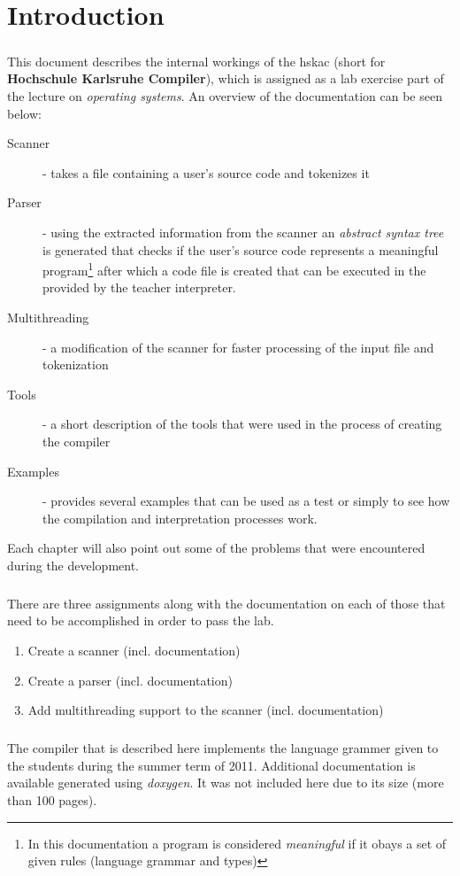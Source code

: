 \chapter{Introduction} 
\paragraph{}
	This document describes the internal workings of the hskac (short for \textbf{Hochschule Karlsruhe Compiler}), which is assigned as a lab exercise part of the lecture on \textit{operating systems}. An overview of the documentation can be seen below:
\begin{description}
\item[Scanner] - takes a file containing a user's source code and tokenizes it
\item[Parser] - using the extracted information from the scanner an \textit{abstract syntax tree} is generated that checks if the user's source code represents a meaningful program\footnote{In this documentation a program is considered \textit{meaningful} if it obays a set of given rules (language grammar and types)} after which a code file is created that can be executed in the provided by the teacher interpreter.
\item[Multithreading] - a modification of the scanner for faster processing of the input file and tokenization
\item[Tools] - a short description of the tools that were used in the process of creating the compiler
\item[Examples] - provides several examples that can be used as a test or simply to see how the compilation and interpretation processes work.
\end{description}
Each chapter will also point out some of the problems that were encountered during the development.
\paragraph{}
	There are three assignments along with the documentation on each of those that need to be accomplished in order to pass the lab.
\begin{enumerate}
\item Create a scanner (incl. documentation)
\item Create a parser (incl. documentation)
\item Add multithreading support to the scanner (incl. documentation)
\end{enumerate}

\paragraph{}
	The compiler that is described here implements the language grammer given to the students during the summer term of 2011. Additional documentation is available generated using \textit{doxygen}. It was not included here due to its size (more than 100 pages).